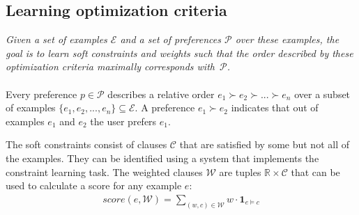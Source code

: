 \documentclass[letterpaper]{article}
\newcommand{\sym}[1]{\ensuremath{\mathcal{#1}}}
\theoremstyle{definition}
\begin{document}

\subsection{Learning optimization criteria}
\emph{Given a set of examples \sym{E} and a set of preferences \sym{P} over these examples, the goal is to learn soft constraints and weights such that the order described by these optimization criteria maximally corresponds with~\sym{P}.}
\\\\
Every preference $p \in \sym{P}$ describes a relative order $e_1 \succ e_2 \succ ... \succ e_n$ over a subset of examples $\{e_1, e_2, ..., e_n\} \subseteq \sym{E}$.
A preference $e_1 \succ e_2$ indicates that out of examples $e_1$ and $e_2$ the user prefers $e_1$.

The soft constraints consist of clauses \sym{C} that are satisfied by some but not all of the examples.
They can be identified using a system that implements the constraint learning task.
The weighted clauses \sym{W} are tuples $\mathbb{R} \times \sym{C}$ that can be used to calculate a score for any example $e$:
\begin{eqnarray}
  \label{eqn:score}
  score(e, \sym{W}) = \sum\limits_{(\mathit{w}, \mathit{c}) \in \sym{W}} \mathit{w} \cdot \mathbf{1}_{e \models c}
\end{eqnarray}
\end{document}
